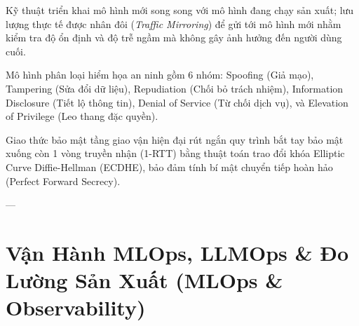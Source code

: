 \begin{description}[leftmargin=2.5cm, style=nextline]
  \item[\term{Shadow Deployment}] Kỹ thuật triển khai mô hình mới song song với mô hình đang chạy sản xuất; lưu lượng thực tế được nhân đôi (\textit{Traffic Mirroring}) để gửi tới mô hình mới nhằm kiểm tra độ ổn định và độ trễ ngầm mà không gây ảnh hưởng đến người dùng cuối.

  \item[\term{STRIDE Threat Model}] Mô hình phân loại hiểm họa an ninh gồm 6 nhóm: Spoofing (Giả mạo), Tampering (Sửa đổi dữ liệu), Repudiation (Chối bỏ trách nhiệm), Information Disclosure (Tiết lộ thông tin), Denial of Service (Từ chối dịch vụ), và Elevation of Privilege (Leo thang đặc quyền).

  \item[\term{TLS 1.3 Handshake}] Giao thức bảo mật tầng giao vận hiện đại rút ngắn quy trình bắt tay bảo mật xuống còn 1 vòng truyền nhận (1-RTT) bằng thuật toán trao đổi khóa Elliptic Curve Diffie-Hellman (ECDHE), bảo đảm tính bí mật chuyển tiếp hoàn hảo (Perfect Forward Secrecy).
\end{description}

---

\section{Vận Hành MLOps, LLMOps \& Đo Lường Sản Xuất (MLOps \& Observability)}
\label{sec:app-glossary-mlops}

